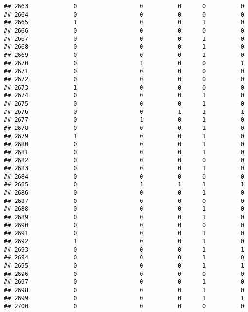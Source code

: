 \documentclass[
]{article}
\begin{document}
\begin{verbatim}
## 2663             0                  0          0      0          0
## 2664             0                  0          0      0          0
## 2665             1                  0          0      1          0
## 2666             0                  0          0      0          0
## 2667             0                  0          0      1          0
## 2668             0                  0          0      1          0
## 2669             0                  0          0      1          0
## 2670             0                  1          0      0          1
## 2671             0                  0          0      0          0
## 2672             0                  0          0      0          0
## 2673             1                  0          0      0          0
## 2674             0                  0          0      1          0
## 2675             0                  0          0      1          0
## 2676             0                  0          1      1          1
## 2677             0                  1          0      1          0
## 2678             0                  0          0      1          0
## 2679             1                  0          0      1          0
## 2680             0                  0          0      1          0
## 2681             0                  0          0      1          0
## 2682             0                  0          0      0          0
## 2683             0                  0          0      1          0
## 2684             0                  0          0      0          0
## 2685             0                  1          1      1          1
## 2686             0                  0          0      1          0
## 2687             0                  0          0      0          0
## 2688             0                  0          0      1          0
## 2689             0                  0          0      1          0
## 2690             0                  0          0      0          0
## 2691             0                  0          0      1          0
## 2692             1                  0          0      1          0
## 2693             0                  0          0      1          1
## 2694             0                  0          0      1          0
## 2695             0                  0          0      1          1
## 2696             0                  0          0      0          0
## 2697             0                  0          0      1          0
## 2698             0                  0          0      1          0
## 2699             0                  0          0      1          1
## 2700             0                  0          0      0          0

\end{verbatim}
\end{document}
